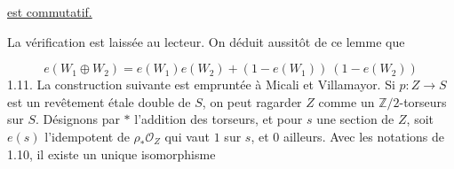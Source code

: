 \begin{center}
\end{center}
\underline{est commutatif.}



La vérification est laissée au lecteur. On déduit aussitôt de ce lemme que

\begin{equation}\tag{1.10.1}
e(W_1 \oplus W_2) = e(W_1)e(W_2) + (1 - e(W_1))\ (1 - e(W_2))
\end{equation}
1.11. La construction suivante est empruntée à Micali et Villamayor. Si $p : Z \longrightarrow S$ est un revêtement étale double de $S$, on peut ragarder $Z$ comme un $\mathbb{Z}/2$-torseurs sur $S$. Désignons par $*$ l'addition des torseurs, et pour $s$ une section de $Z$, soit $e(s)$ l'idempotent de $\rho_* \mathcal{O}_Z$ qui vaut $1$ sur $s$, et $0$ ailleurs. Avec les notations de 1.10, il existe un unique isomorphisme

